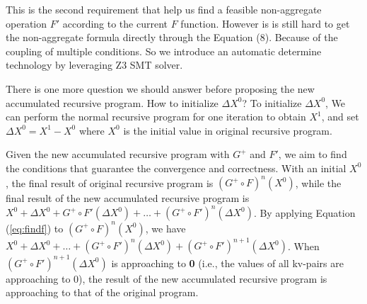 This is the second requirement that help us find a feasible non-aggregate operation $F'$ according to the current $F$ function. However is is still hard to get the non-aggregate formula directly through the Equation (8). Because of the coupling of multiple conditions. So we introduce an automatic determine technology by leveraging Z3 SMT solver.  
{\color{green} There is one more question we should answer before proposing the new accumulated recursive program. How to initialize $\Delta X^0$? To initialize $\Delta X^0$,  We can perform the normal recursive program for one iteration to obtain $X^1$, and set $\Delta X^0=X^1-X^0$ where $X^0$ is the initial value in original recursive program.
	
	Given the new accumulated recursive program with $G^+$ and $F'$, we aim to find the conditions that guarantee the convergence and correctness. With an initial $X^0$, the final result of original recursive program is $(G^{+}\circ F)^n(X^0)$, while the final result of the new accumulated recursive program is $X^0+\Delta X^0+G^+\circ F'(\Delta X^0)+\ldots+(G^+\circ F')^n(\Delta X^0)$. By applying Equation (\ref{eq:findf}) to $(G^{+}\circ F)^n(X^0)$, we have $X^0+\Delta X^0+\ldots+(G^+\circ F')^n(\Delta X^0)+(G^+\circ F')^{n+1}(\Delta X^0)$. When $(G^+\circ F')^{n+1}(\Delta X^0)$ is approaching to \textbf{0} (i.e., the values of all kv-pairs are approaching to 0), the result of the new accumulated recursive program is approaching to that of the original program.
}


